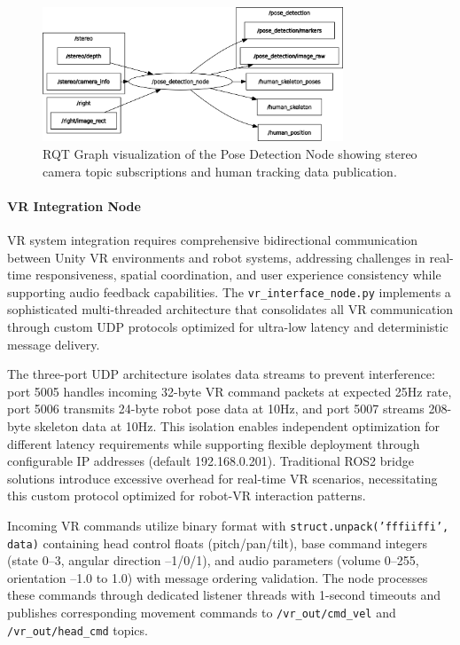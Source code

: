 \begin{figure}[H]
    \centering
    \includegraphics[width=0.8\textwidth]{Images/posenode.png}
    \caption{RQT Graph visualization of the Pose Detection Node showing stereo camera topic subscriptions and human tracking data publication.}
    \label{fig:rqt_pose_detection_node}
\end{figure}

\paragraph{VR Integration Node}

VR system integration requires comprehensive bidirectional communication between Unity VR environments and robot systems, addressing challenges in real-time responsiveness, spatial coordination, and user experience consistency while supporting audio feedback capabilities. The \texttt{vr\_interface\_node.py} implements a sophisticated multi-threaded architecture that consolidates all VR communication through custom UDP protocols optimized for ultra-low latency and deterministic message delivery.

The three-port UDP architecture isolates data streams to prevent interference: port 5005 handles incoming 32-byte VR command packets at expected 25Hz rate, port 5006 transmits 24-byte robot pose data at 10Hz, and port 5007 streams 208-byte skeleton data at 10Hz. This isolation enables independent optimization for different latency requirements while supporting flexible deployment through configurable IP addresses (default 192.168.0.201). Traditional ROS2 bridge solutions introduce excessive overhead for real-time VR scenarios, necessitating this custom protocol optimized for robot-VR interaction patterns.

Incoming VR commands utilize binary format with \texttt{struct.unpack('fffiiffi', data)} containing head control floats (pitch/pan/tilt), base command integers (state 0--3, angular direction --1/0/1), and audio parameters (volume 0--255, orientation --1.0 to 1.0) with message ordering validation. The node processes these commands through dedicated listener threads with 1-second timeouts and publishes corresponding movement commands to \texttt{/vr\_out/cmd\_vel} and \texttt{/vr\_out/head\_cmd} topics.

